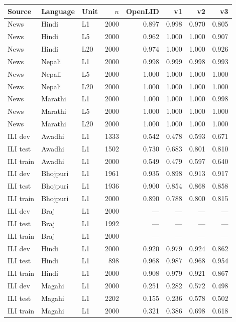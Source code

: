 \begin{tabular}{lllrrrrr}
\toprule
Source & Language & Unit & $n$ & OpenLID & v1 & v2 & v3 \\
\midrule
News & Hindi & L1 & 2000 & 0.897 & 0.998 & 0.970 & 0.805 \\
News & Hindi & L5 & 2000 & 0.962 & 1.000 & 1.000 & 0.907 \\
News & Hindi & L20 & 2000 & 0.974 & 1.000 & 1.000 & 0.926 \\
News & Nepali & L1 & 2000 & 0.998 & 0.999 & 0.998 & 0.993 \\
News & Nepali & L5 & 2000 & 1.000 & 1.000 & 1.000 & 1.000 \\
News & Nepali & L20 & 2000 & 1.000 & 1.000 & 1.000 & 1.000 \\
News & Marathi & L1 & 2000 & 1.000 & 1.000 & 1.000 & 0.998 \\
News & Marathi & L5 & 2000 & 1.000 & 1.000 & 1.000 & 1.000 \\
News & Marathi & L20 & 2000 & 1.000 & 1.000 & 1.000 & 1.000 \\
ILI dev & Awadhi & L1 & 1333 & 0.542 & 0.478 & 0.593 & 0.671 \\
ILI test & Awadhi & L1 & 1502 & 0.730 & 0.683 & 0.801 & 0.810 \\
ILI train & Awadhi & L1 & 2000 & 0.549 & 0.479 & 0.597 & 0.640 \\
ILI dev & Bhojpuri & L1 & 1961 & 0.935 & 0.898 & 0.913 & 0.917 \\
ILI test & Bhojpuri & L1 & 1936 & 0.900 & 0.854 & 0.868 & 0.858 \\
ILI train & Bhojpuri & L1 & 2000 & 0.890 & 0.788 & 0.800 & 0.815 \\
ILI dev & Braj & L1 & 2000 & --- & --- & --- & --- \\
ILI test & Braj & L1 & 1992 & --- & --- & --- & --- \\
ILI train & Braj & L1 & 2000 & --- & --- & --- & --- \\
ILI dev & Hindi & L1 & 2000 & 0.920 & 0.979 & 0.924 & 0.862 \\
ILI test & Hindi & L1 & 898 & 0.968 & 0.987 & 0.968 & 0.954 \\
ILI train & Hindi & L1 & 2000 & 0.908 & 0.979 & 0.921 & 0.867 \\
ILI dev & Magahi & L1 & 2000 & 0.251 & 0.282 & 0.572 & 0.498 \\
ILI test & Magahi & L1 & 2202 & 0.155 & 0.236 & 0.578 & 0.502 \\
ILI train & Magahi & L1 & 2000 & 0.321 & 0.386 & 0.698 & 0.618 \\

\end{tabular}
